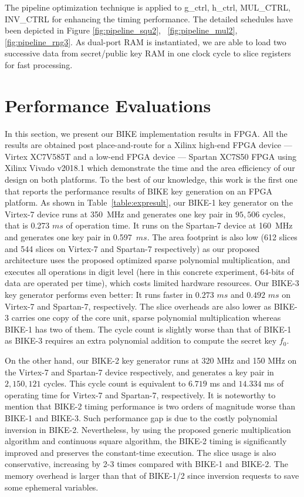 \documentclass[runningheads]{llncs}
\begin{document}
 The pipeline optimization technique is applied to g\_ctrl, h\_ctrl, MUL\_CTRL, INV\_CTRL for enhancing the timing performance. The detailed schedules have been depicted in Figure \ref{fig:pipeline_squ2}, ~\ref{fig:pipeline_mul2}, \ref{fig:pipeline_rng3}. As dual-port RAM is instantiated, we are able to load two successive data from secret/public key RAM in one clock cycle to slice registers for fast processing.

\section{Performance Evaluations}
\label{sec::evaluation}




In this section, we present our BIKE implementation results in FPGA. All the results are obtained post place-and-route for a  Xilinx high-end FPGA device --- Virtex XC7V585T  and a low-end FPGA device ---  Spartan XC7S50 FPGA using Xilinx Vivado v2018.1 which demonstrate the time and the area efficiency of our design on both platforms. To the best of our knowledge, this work is the first one that reports the performance results of BIKE key generation on an FPGA platform. As shown in Table~\ref{table:expresult}, our BIKE-1 key generator on the Virtex-7 device runs at 350~MHz and generates one key pair  in $95,506$ cycles, that is 0.273 $ms$ of operation time. It runs on the Spartan-7 device at 160~MHz and generates one key pair in 0.597~$ms$. The area footprint is also low (612 slices and 544 slices on Virtex-7 and Spartan-7 respectively) as our proposed architecture uses the proposed optimized sparse polynomial multiplication, and executes all operations in digit level (here in this concrete experiment, 64-bits of data are operated per time), which costs limited hardware resources. Our BIKE-3 key generator performs even better: It runs faster in $0.273$ $ms$ and $0.492$ $ms$ on Virtex-7 and Spartan-7, respectively. The slice overheads are also lower as BIKE-3 carries one copy of the core unit, sparse polynomial multiplication whereas BIKE-1 has two of them. The cycle count is slightly worse than that of BIKE-1 as BIKE-3 requires an extra polynomial addition to compute the secret key $f_0$.

On the other hand, our BIKE-2 key generator runs at 320 MHz and 150 MHz on the Virtex-7 and Spartan-7 device respectively, and generates a key pair in $2,150,121$ cycles. This cycle count is equivalent to $6.719$ ms and $14.334$ ms of operating time for Virtex-7 and Spartan-7, respectively. It is noteworthy to mention that BIKE-2 timing performance is  two orders of magnitude worse than BIKE-1 and BIKE-3.  Such performance gap is due to the costly polynomial inversion in BIKE-2. Nevertheless, by using the proposed generic multiplication algorithm and continuous square algorithm, the BIKE-2 timing is significantly improved and preserves the constant-time execution. The slice usage is also conservative, increasing by 2-3 times compared with BIKE-1 and BIKE-2.  The memory overhead is larger than that of BIKE-1/2 since inversion requests to save some ephemeral variables.
\end{document}
